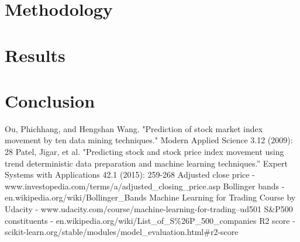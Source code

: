 \documentclass[10pt]{report}
\begin{document}
\section{Methodology}

\section{Results}

\section{Conclusion}

\begin{thebibliography}{}

Ou, Phichhang, and Hengshan Wang. "Prediction of stock market index movement by ten data mining techniques." Modern Applied Science 3.12 (2009): 28
Patel, Jigar, et al. "Predicting stock and stock price index movement using trend deterministic data preparation and machine learning techniques.” Expert Systems with Applications 42.1 (2015): 259-268
Adjusted close price - www.investopedia.com/terms/a/adjusted\_closing\_price.asp
Bollinger bands - en.wikipedia.org/wiki/Bollinger\_Bands
Machine Learning for Trading Course by Udacity - www.udacity.com/course/machine-learning-for-trading--ud501
S\&P500 constituents - en.wikipedia.org/wiki/List\_of\_S\%26P\_500\_companies
R2 score - scikit-learn.org/stable/modules/model\_evaluation.html\#r2-score

\end{thebibliography}
\end{document}
